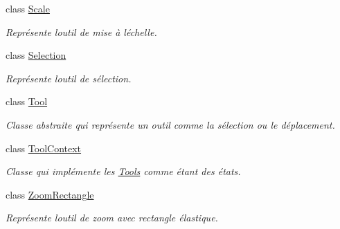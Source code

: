 \begin{DoxyCompactItemize}
class \hyperlink{class_interface_graphique_1_1_tools_1_1_scale}{Scale}
\begin{DoxyCompactList}\small\item\em Représente l\textquotesingle{}outil de mise à l\textquotesingle{}échelle. \end{DoxyCompactList}\item 
class \hyperlink{class_interface_graphique_1_1_tools_1_1_selection}{Selection}
\begin{DoxyCompactList}\small\item\em Représente l\textquotesingle{}outil de sélection. \end{DoxyCompactList}\item 
class \hyperlink{class_interface_graphique_1_1_tools_1_1_tool}{Tool}
\begin{DoxyCompactList}\small\item\em Classe abstraite qui représente un outil comme la sélection ou le déplacement. \end{DoxyCompactList}\item 
class \hyperlink{class_interface_graphique_1_1_tools_1_1_tool_context}{Tool\+Context}
\begin{DoxyCompactList}\small\item\em Classe qui implémente les \hyperlink{namespace_interface_graphique_1_1_tools}{Tools} comme étant des états. \end{DoxyCompactList}\item 
class \hyperlink{class_interface_graphique_1_1_tools_1_1_zoom_rectangle}{Zoom\+Rectangle}
\begin{DoxyCompactList}\small\item\em Représente l\textquotesingle{}outil de zoom avec rectangle élastique. \end{DoxyCompactList}\end{DoxyCompactItemize}
